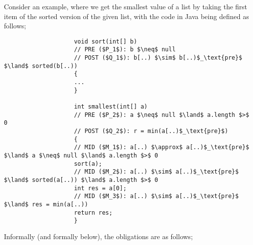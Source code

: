 \documentclass[a4paper, 12pt]{article}
\begin{document}
                Consider an example, where we get the smallest value of a list by taking the first item of the sorted version of the given list, with the code in Java being defined as follows;
                \begin{lstlisting}
                    void sort(int[] b)
                    // PRE ($P_1$): b $\neq$ null
                    // POST ($Q_1$): b[..) $\sim$ b[..)$_\text{pre}$ $\land$ sorted(b[..))
                    {
                    ...
                    }

                    int smallest(int[] a)
                    // PRE ($P_2$): a $\neq$ null $\land$ a.length $>$ 0
                    // POST ($Q_2$): r = min(a[..)$_\text{pre}$)
                    {
                    // MID ($M_1$): a[..) $\approx$ a[..)$_\text{pre}$ $\land$ a $\neq$ null $\land$ a.length $>$ 0
                    sort(a);
                    // MID ($M_2$): a[..) $\sim$ a[..)$_\text{pre}$ $\land$ sorted(a[..)) $\land$ a.length $>$ 0
                    int res = a[0];
                    // MID ($M_3$): a[..) $\sim$ a[..)$_\text{pre}$ $\land$ res = min(a[..))
                    return res;
                    }
                \end{lstlisting}
                Informally (and formally below), the obligations are as follows;
\end{document}
